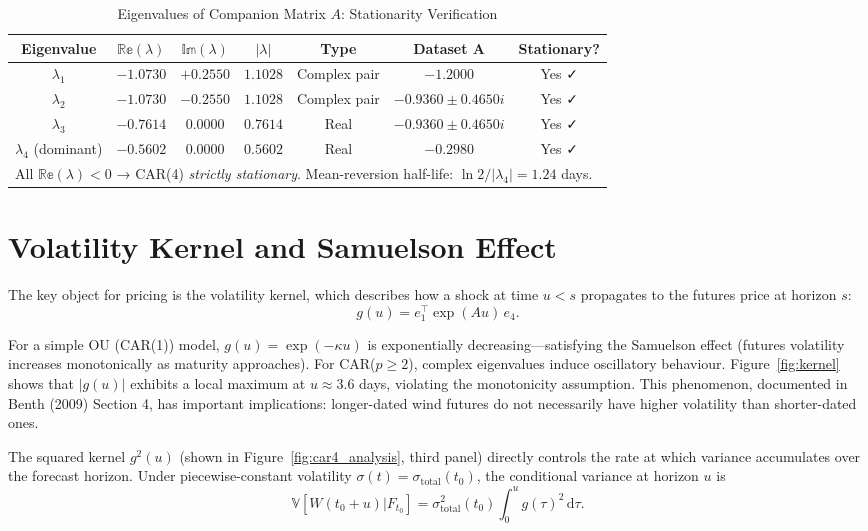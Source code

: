 \documentclass[11pt, a4paper, twoside]{article}
\begin{document}
\begin{table}[ht]
\centering
\caption{Eigenvalues of Companion Matrix $A$: Stationarity Verification}
\label{tbl:eigenvalues}
\small
\begin{tabularx}{\textwidth}{c|cc|cc|cc}
\toprule
\textbf{Eigenvalue} & $\mathbb{Re}(\lambda)$ & $\mathbb{Im}(\lambda)$ & $|\lambda|$ & \textbf{Type} & \textbf{Dataset A} & \textbf{Stationary?} \\
\midrule
$\lambda_1$ & $-1.0730$ & $+0.2550$ & $1.1028$ & Complex pair & $-1.2000$ & Yes ✓ \\
$\lambda_2$ & $-1.0730$ & $-0.2550$ & $1.1028$ & Complex pair & $-0.9360 \pm 0.4650i$ & Yes ✓ \\
$\lambda_3$ & $-0.7614$ & $0.0000$ & $0.7614$ & Real & $-0.9360 \pm 0.4650i$ & Yes ✓ \\
$\lambda_4$ (dominant) & $-0.5602$ & $0.0000$ & $0.5602$ & Real & $-0.2980$ & Yes ✓ \\
\midrule
\multicolumn{7}{l}{All $\mathbb{Re}(\lambda) < 0$ → CAR(4) \textit{strictly stationary}. Mean-reversion half-life: $\ln 2 / |\lambda_4| = 1.24$ days.} \\
\bottomrule
\end{tabularx}
\end{table}

\section{Volatility Kernel and Samuelson Effect}

The key object for pricing is the volatility kernel, which describes how a shock at time $u < s$ propagates to the futures price at horizon $s$:
\begin{equation}
g(u) = e_1^{\top} \exp(Au) \, e_4.
\end{equation}

For a simple OU (CAR(1)) model, $g(u) = \exp(-\kappa u)$ is exponentially decreasing---satisfying the Samuelson effect (futures volatility increases monotonically as maturity approaches). For CAR($p \geq 2$), complex eigenvalues induce oscillatory behaviour. Figure~\ref{fig:kernel} shows that $|g(u)|$ exhibits a local maximum at $u \approx 3.6$ days, violating the monotonicity assumption. This phenomenon, documented in Benth (2009) Section 4, has important implications: longer-dated wind futures do not necessarily have higher volatility than shorter-dated ones.

The squared kernel $g^2(u)$ (shown in Figure~\ref{fig:car4_analysis}, third panel) directly controls the rate at which variance accumulates over the forecast horizon. Under piecewise-constant volatility $\sigma(t) = \sigma_{\text{total}}(t_0)$, the conditional variance at horizon $u$ is
\begin{equation}
\mathbb{V}[W(t_0+u)|F_{t_0}] = \sigma^2_{\text{total}}(t_0) \int_0^u g(\tau)^2 \, \mathrm{d}\tau.
\end{equation}
\end{document}
